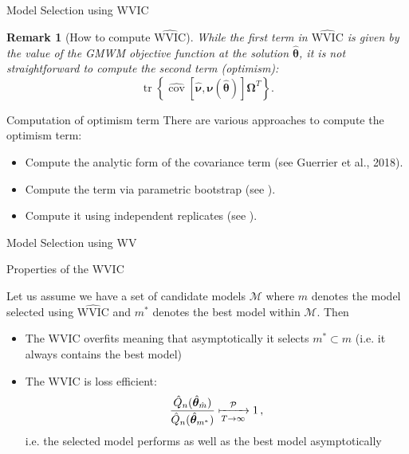 \documentclass[envcountsect,usenames,dvipsnames]{beamer}
\DeclareMathOperator*{\cov}{cov}
\DeclareMathOperator*{\tr}{tr}
\theoremstyle{mystyle}
\newtheorem{Remark}{Remark}
\begin{document}
\begin{frame}{Model Selection using WVIC}

\begin{Remark}[How to compute $\widehat{\text{WVIC}}$]
\small
While the first term in $\widehat{\text{WVIC}}$ is given by the value of the GMWM objective function at the solution $\hat{\bm{\theta}}$, it is not straightforward to compute the second term (optimism):
$$\tr \left\{ \widehat{\cov} \left[ \hat{\bm{\nu}} ,  \bm{\nu}( \hat{\bm{\theta}}) \right] \bm{\Omega}^T\right\}.$$

\end{Remark}

\begin{block}{Computation of optimism term}
	\small
There are various approaches to compute the optimism term:
\begin{itemize}
    \item Compute the analytic form of the covariance term (see Guerrier et al., 2018).
    \item Compute the term via parametric bootstrap (see \cite{guerrier2015wvic}).
    \item Compute it using independent replicates (see \cite{radi2017authomatic}).
\end{itemize}
\end{block}

\end{frame}

\begin{frame}{Model Selection using WV}
    
\begin{block}{Properties of the WVIC}

Let us assume we have a set of candidate models $\mathcal{M}$ where $\hat{m}$ denotes the model selected using $\widehat{\text{WVIC}}$ and $m^*$ denotes the best model within $\mathcal{M}$. Then
%
\begin{itemize}
    \item The WVIC overfits meaning that asymptotically it selects $m^* \subset \hat{m}$ (i.e. it always contains the best model)
    \item The WVIC is loss efficient:
    \begin{equation*}
        \frac{\hat{Q}_n(\hat{\bm{\theta}}_{\hat{m}})}{\hat{Q}_n(\hat{\bm{\theta}}_{m^*})} \xmapsto[T\rightarrow\infty]{\mathcal{P}} 1 \,,
    \end{equation*}
    i.e. the selected model performs as well as the best model asymptotically
\end{itemize}

\end{block}

\end{frame}
\end{document}
